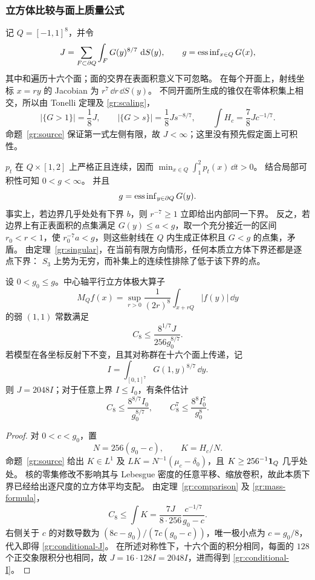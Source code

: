 \subsubsection{立方体比较与面上质量公式}

记 $Q=[-1,1]^8$，并令
\[
 J=\sum_{F\subset\partial Q}\int_FG(y)^{8/7}\,\,\mathrm d S(y),
 \qquad g=\operatorname{ess\,inf}_{x\in Q}G(x),
\]
其中和遍历十六个面；面的交界在表面积意义下可忽略。
在每个开面上，射线坐标 $x=ry$ 的 Jacobian 为 $r^7\,\dd r\,\dd S(y)$。
不同开面所生成的锥仅在零体积集上相交，所以由 Tonelli 定理及 \eqref{gr:scaling}，
\begin{equation}\label{gr:mass-formula}
 |\{G>1\}|=\frac18J,\qquad
 |\{G>s\}|=\frac18Js^{-8/7},\qquad
 \int H_c=\frac78Jc^{-1/7}.
\end{equation}
命题~\ref{gr:source} 保证第一式左侧有限，故 $J<\infty$；这里没有预先假定面上可积性。

$p_t$ 在 $Q\times[1,2]$ 上严格正且连续，因而
$\min_{x\in Q}\int_1^2p_t(x)\,\dd t>0$。
结合局部可积性可知 $0<g<\infty$。
并且
\begin{equation}\label{gr:essential-face}
 g=\operatorname{ess\,inf}_{y\in\partial Q}G(y).
\end{equation}
事实上，若边界几乎处处有下界 $b$，则 $r^{-7}\ge1$ 立即给出内部同一下界。
反之，若边界上有正表面积的点集满足 $G(y)\le a<g$，取一个充分接近一的区间
$r_0<r<1$，使 $r_0^{-7}a<g$，则这些射线在 $Q$ 内生成正体积且 $G<g$ 的点集，矛盾。
由定理~\ref{gr:singular}，在当前有限方向情形，任何本质立方体下界还都是逐点下界：
$S_3$ 上势为无穷，而补集上的连续性排除了低于该下界的点。

\begin{corollary}\label{gr:cube}
设 $0<g_0\le g$。中心轴平行立方体极大算子
\[
 M_Qf(x)=\sup_{r>0}\frac1{(2r)^8}\int_{x+rQ}|f(y)|\,\dd y
\]
的弱 $(1,1)$ 常数满足
\begin{equation}\label{gr:conditional-J}
 C_8\le\frac{8^{1/7}J}{256g_0^{8/7}}.
\end{equation}
若模型在各坐标反射下不变，且其对称群在十六个面上传递，记
\[
 I=\int_{[0,1]^7}G(1,y)^{8/7}\,\dd y.
\]
则 $J=2048I$；对于任意上界 $I\le I_0$，有条件估计
\begin{equation}\label{gr:conditional-I}
 C_8\le\frac{8^{8/7}I_0}{g_0^{8/7}},\qquad
 C_8^7\le\frac{8^8I_0^7}{g_0^8}.
\end{equation}
\end{corollary}

\begin{proof}
对 $0<c<g_0$，置
\[
 N=256(g_0-c),\qquad K=H_c/N.
\]
命题~\ref{gr:source} 给出 $K\in L^1$ 及
$LK=N^{-1}(\mu_c-\delta_0)$，且 $K\ge256^{-1}\mathbf{1}_Q$ 几乎处处。
核的零集修改不影响其与 Lebesgue 密度的任意平移、缩放卷积，故此本质下界已经给出逐尺度的立方体平均支配。
由定理~\ref{gr:comparison} 及 \eqref{gr:mass-formula}，
\[
 C_8\le\int K
 =\frac{7J}{8\cdot256}\frac{c^{-1/7}}{g_0-c}.
\]
右侧关于 $c$ 的对数导数为 $(8c-g_0)/(7c(g_0-c))$，唯一极小点为 $c=g_0/8$，代入即得 \eqref{gr:conditional-J}。
在所述对称性下，十六个面的积分相同，每面的 $128$ 个正交象限积分也相同，故 $J=16\cdot128I=2048I$，进而得到 \eqref{gr:conditional-I}。
\end{proof}

